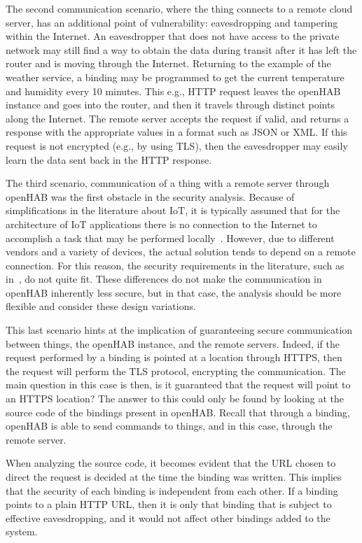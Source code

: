 \documentclass[12pt]{article}
\begin{document}
The second communication scenario, where the thing connects to a remote cloud server, has an additional point of vulnerability: eavesdropping and tampering within the Internet. An eavesdropper that does not have access to the private network may still find a way to obtain the data during transit after it has left the router and is moving through the Internet. Returning to the example of the weather service, a binding may be programmed to get the current temperature and humidity every 10 minutes. This e.g., HTTP request leaves the openHAB instance and goes into the router, and then it travels through distinct points along the Internet. The remote server accepts the request if valid, and returns a response with the appropriate values in a format such as JSON or XML. If this request is not encrypted (e.g., by using TLS), then the eavesdropper may easily learn the data sent back in the HTTP response.

The third scenario, communication of a thing with a remote server through openHAB was the first obstacle in the security analysis. Because of simplifications in the literature about IoT, it is typically assumed that for the architecture of IoT applications there is no connection to the Internet to accomplish a task that may be performed locally~\cite{ALABA201710}. However, due to different vendors and a variety of devices, the actual solution tends to depend on a remote connection. For this reason, the security requirements in the literature, such as in~\cite{taekim}, do not quite fit. These differences do not make the communication in openHAB inherently less secure, but in that case, the analysis should be more flexible and consider these design variations. 

This last scenario hints at the implication of guaranteeing secure communication between things, the openHAB instance, and the remote servers. Indeed, if the request performed by a binding is pointed at a location through HTTPS, then the request will perform the TLS protocol, encrypting the communication. The main question in this case is then, is it guaranteed that the request will point to an HTTPS location? The answer to this could only be found by looking at the source code of the bindings present in openHAB. Recall that through a binding, openHAB is able to send commands to things, and in this case, through the remote server.

When analyzing the source code, it becomes evident that the URL chosen to direct the request is decided at the time the binding was written. This implies that the security of each binding is independent from each other. If a binding points to a plain HTTP URL, then it is only that binding that is subject to effective eavesdropping, and it would not affect other bindings added to the system.
\end{document}
